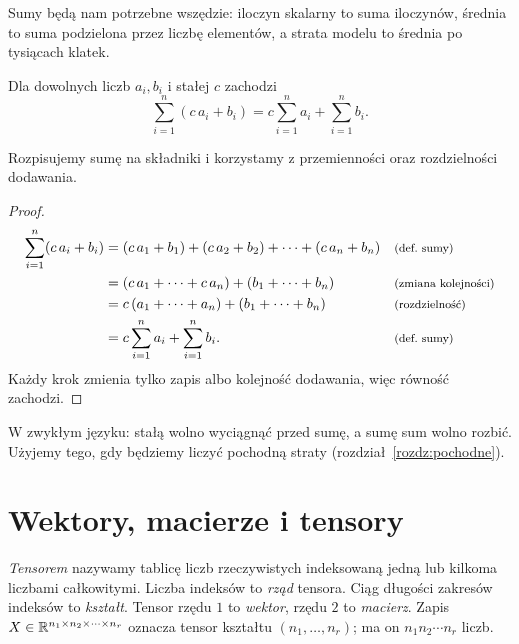Sumy będą nam potrzebne wszędzie: iloczyn skalarny to suma iloczynów, średnia to suma podzielona
przez liczbę elementów, a strata modelu to średnia po tysiącach klatek.

\begin{twierdzenie}\label{tw:liniowosc-sumy}
Dla dowolnych liczb $a_i,b_i$ i stałej $c$ zachodzi
\begin{equation}
  \sum_{i=1}^{n}(c\,a_i+b_i)=c\sum_{i=1}^{n}a_i+\sum_{i=1}^{n}b_i .
\end{equation}
\end{twierdzenie}
\begin{pomyslDowodu}
Rozpisujemy sumę na składniki i korzystamy z przemienności oraz rozdzielności dodawania.
\end{pomyslDowodu}
\begin{proof}
\begin{align*}
\sum_{i=1}^{n}(c\,a_i+b_i)
 &= (c\,a_1+b_1)+(c\,a_2+b_2)+\dots+(c\,a_n+b_n)
   && \text{\footnotesize (def.~sumy)}\\
 &= (c\,a_1+\dots+c\,a_n)+(b_1+\dots+b_n)
   && \text{\footnotesize (zmiana kolejności)}\\
 &= c\,(a_1+\dots+a_n)+(b_1+\dots+b_n)
   && \text{\footnotesize (rozdzielność)}\\
 &= c\sum_{i=1}^{n}a_i+\sum_{i=1}^{n}b_i .
   && \text{\footnotesize (def.~sumy)}
\end{align*}
Każdy krok zmienia tylko zapis albo kolejność dodawania, więc równość zachodzi.
\end{proof}

W zwykłym języku: stałą wolno wyciągnąć przed sumę, a sumę sum wolno rozbić. Użyjemy tego, gdy będziemy
liczyć pochodną straty (rozdział~\ref{rozdz:pochodne}).

\section{Wektory, macierze i tensory}

\begin{definicja}\label{def:tensor}
\emph{Tensorem} nazywamy tablicę liczb rzeczywistych indeksowaną jedną lub kilkoma liczbami całkowitymi.
Liczba indeksów to \emph{rząd} tensora. Ciąg długości zakresów indeksów to \emph{kształt}.
Tensor rzędu $1$ to \emph{wektor}, rzędu $2$ to \emph{macierz}. Zapis $X\in\mathbb{R}^{n_1\times n_2\times\dots\times n_r}$
oznacza tensor kształtu $(n_1,\dots,n_r)$; ma on $n_1 n_2\cdots n_r$ liczb.
\end{definicja}

